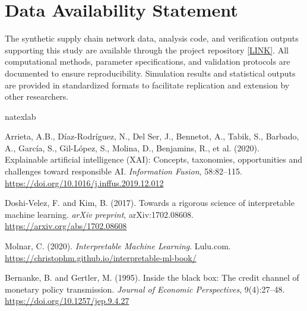 \documentclass[a4paper,11pt,twoside]{article}
\newcommand{\0}{\Bf{0}}
\theoremstyle{definition}
\begin{document}
\section*{Data Availability Statement}
The synthetic supply chain network data, analysis code, and verification outputs supporting this study are available through the project repository \href{https://github.com/omoshola-o/explainable-credit-intelligence}{[LINK]}. All computational methods, parameter specifications, and validation protocols are documented to ensure reproducibility. Simulation results and statistical outputs are provided in standardized formats to facilitate replication and extension by other researchers.
\def\cprime{$'$} \def\cprime{$'$}
{\color{Brown}\begin{thebibliography}{99}
{\color{black}

\expandafter\ifx\csname natexlab\endcsname\relax\def\natexlab#1{#1}\fi
\providecommand{\bibinfo}[2]{#2}
\ifx\xfnm\relax \def\xfnm[#1]{\unskip,\space#1}\fi
\raggedright

 Arrieta, A.B., Díaz-Rodríguez, N., Del Ser, J., Bennetot, A., Tabik, S., Barbado, A., García, S., Gil-López, S., Molina, D., Benjamins, R., et al. (2020). Explainable artificial intelligence (XAI): Concepts, taxonomies, opportunities and challenges toward responsible AI. \emph{Information Fusion}, 58:82--115. \url{https://doi.org/10.1016/j.inffus.2019.12.012}

\par\vspace{0.8em}

 Doshi-Velez, F. and Kim, B. (2017). Towards a rigorous science of interpretable machine learning. \emph{arXiv preprint}, arXiv:1702.08608. \url{https://arxiv.org/abs/1702.08608}

\par\vspace{0.8em}

 Molnar, C. (2020). \emph{Interpretable Machine Learning}. Lulu.com. \url{https://christophm.github.io/interpretable-ml-book/}

 Bernanke, B. and Gertler, M. (1995). Inside the black box: The credit channel of monetary policy transmission. \emph{Journal of Economic Perspectives}, 9(4):27--48. \url{https://doi.org/10.1257/jep.9.4.27}

}
\end{thebibliography}}
\end{document}
